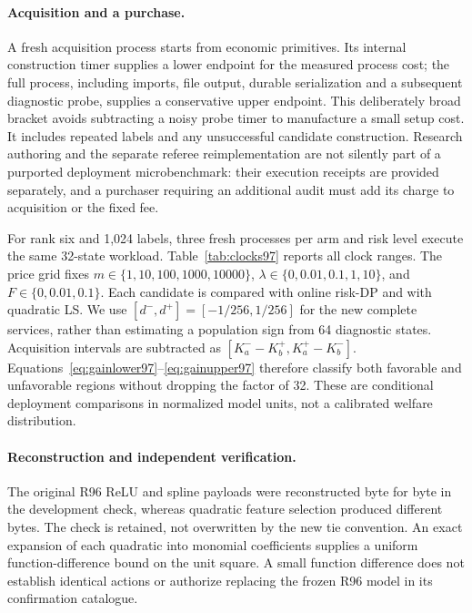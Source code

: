 \paragraph{Acquisition and a purchase.}
A fresh acquisition process starts from economic primitives. Its internal construction timer supplies a lower endpoint for the measured process cost; the full process, including imports, file output, durable serialization and a subsequent diagnostic probe, supplies a conservative upper endpoint. This deliberately broad bracket avoids subtracting a noisy probe timer to manufacture a small setup cost. It includes repeated labels and any unsuccessful candidate construction. Research authoring and the separate referee reimplementation are not silently part of a purported deployment microbenchmark: their execution receipts are provided separately, and a purchaser requiring an additional audit must add its charge to acquisition or the fixed fee.

For rank six and 1,024 labels, three fresh processes per arm and risk level execute the same 32-state workload. Table~\ref{tab:clocks97} reports all clock ranges. The price grid fixes $m\in\{1,10,100,1000,10000\}$, $\lambda\in\{0,0.01,0.1,1,10\}$, and $F\in\{0,0.01,0.1\}$. Each candidate is compared with online risk-DP and with quadratic LS. We use $[d^-,d^+]=[-1/256,1/256]$ for the new complete services, rather than estimating a population sign from 64 diagnostic states. Acquisition intervals are subtracted as $[K_a^- -K_b^+,K_a^+-K_b^-]$. Equations~\eqref{eq:gainlower97}--\eqref{eq:gainupper97} therefore classify both favorable and unfavorable regions without dropping the factor of 32. These are conditional deployment comparisons in normalized model units, not a calibrated welfare distribution.


\paragraph{Reconstruction and independent verification.}
The original R96 ReLU and spline payloads were reconstructed byte for byte in the development check, whereas quadratic feature selection produced different bytes. The check is retained, not overwritten by the new tie convention. An exact expansion of each quadratic into monomial coefficients supplies a uniform function-difference bound on the unit square. A small function difference does not establish identical actions or authorize replacing the frozen R96 model in its confirmation catalogue.

